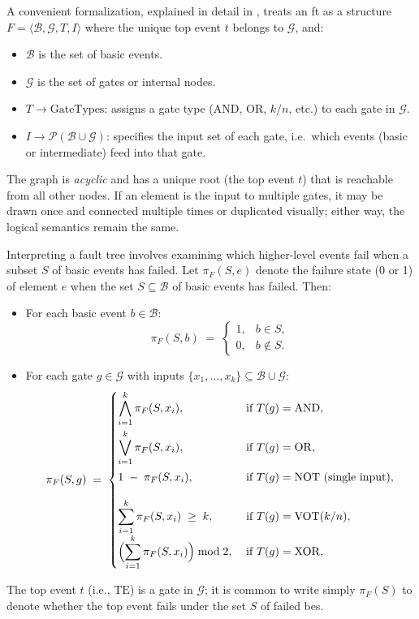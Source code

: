 A convenient formalization, explained in detail in \cite{ruijters_fault_2015}, treats an \acrshort{ft} as a structure \(F = \langle \mathcal{B}, \mathcal{G}, T, I \rangle\) where the unique top event \(t\) belongs to \(\mathcal{G}\), and:

\begin{itemize}
\item \(\mathcal{B}\) is the set of basic events. 
\item \(\mathcal{G}\) is the set of gates or internal nodes.
\item \(T \to \text{GateTypes}\): assigns a gate type (AND, OR, \(k/n\), etc.) to each gate in \(\mathcal{G}\).  
\item \(I \to \mathcal{P}(\mathcal{B} \cup \mathcal{G})\): specifies the input set of each gate, i.e.\ which events (basic or intermediate) feed into that gate.  
\end{itemize}

The graph is \emph{acyclic} and has a unique root (the top event \(t\)) that is reachable from all other nodes. If an element is the input to multiple gates, it may be drawn once and connected multiple times or duplicated visually; either way, the logical semantics remain the same.

Interpreting a fault tree involves examining which higher-level events fail when a subset $S$ of basic events has failed. Let $\pi_F(S, e)$ denote the failure state (0 or 1) of element $e$ when the set $S \subseteq \mathcal{B}$ of basic events has failed. Then:

\begin{itemize}
\item For each basic event \(b \in \mathcal{B}\):
  \[
    \pi_F(S, b) \;=\;
    \begin{cases}
      1, & b \in S,\\
      0, & b \notin S.
    \end{cases}
  \]
\item For each gate \(g \in \mathcal{G}\) with inputs \(\{x_1,\dots,x_k\}\subseteq \mathcal{B}\cup\mathcal{G}\):
  \[
  \pi_F(S,g) 
  \;=\;
  \begin{cases}
  \displaystyle
    \bigwedge_{i=1}^k \pi_F(S, x_i),
    & \;\text{if }T(g)=\mathrm{AND},\\[1.2em]
  \displaystyle
    \bigvee_{i=1}^k \pi_F(S, x_i),
    & \;\text{if }T(g)=\mathrm{OR},\\[1.2em]
  \displaystyle
    1 \;-\; \pi_F(S, x_i),
    & \;\text{if }T(g)=\mathrm{NOT} \text{ (single input)},\\[1.2em]
  \displaystyle
    \sum_{i=1}^k \pi_F(S,x_i)\;\ge\;k,
    & \;\text{if }T(g)=\mathrm{VOT}(k/n),\\
  \displaystyle
    \Bigl(\sum_{i=1}^k \pi_F(S,x_i)\Bigr)\bmod 2,
    & \;\text{if }T(g)=\mathrm{XOR} ,\\[0.6em]
  \end{cases}
  \]
\end{itemize}

The top event $t$ (i.e., $\mathrm{TE}$) is a gate in $\mathcal{G}$; it is common to write simply $\pi_F(S)$ to denote whether the top event fails under the set $S$ of failed \acrshort{be}s.
